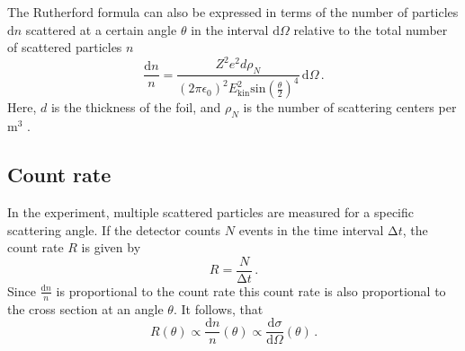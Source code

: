 The Rutherford formula can also be expressed in terms of the number of particles $\mathrm{d}n$ scattered at a certain angle $\theta$ in the interval $\mathrm{d} \Omega$ relative to the total number of scattered particles $n$
\begin{equation}
    \frac{\mathrm{d} n}{n} = \frac{Z^2 e^2 d \rho_{N}}{\left(2 \pi \epsilon_0\right)^2 E_{\mathrm{kin}}^2 \mathrm{sin}\left(\frac{\theta}{2}\right)^4} \, \mathrm{d} \Omega \, .
    \label{eqn:rutherfordn}
\end{equation}
Here, $d$ is the thickness of the foil, and $\rho_N$ is the number of scattering centers per $\unit{\meter\cubed}$ \cite[39-44]{haken_1984}.


\subsection{Count rate}
In the experiment, multiple scattered particles are measured for a specific scattering angle. 
If the detector counts $N$ events in the time interval $\mathrm{\Delta}t$, the count rate $R$ is given by
\begin{equation}
    R = \frac{N}{\mathrm{\Delta} t} \, . 
    \label{eqn:countrate}
\end{equation}
Since $\frac{\mathrm{d} n}{n}$ is proportional to the count rate \cite[42]{haken_1984}
this count rate is also proportional to the cross section at an angle $\theta$. %
It follows, that
\begin{equation} 
    R \left(\theta\right) \propto \frac{\mathrm{d} n}{n} \left(\theta\right) \propto \frac{\mathrm{d} \sigma}{\mathrm{d} \Omega} \left(\theta\right) \, .
    \label{eqn:RpropWQ}
\end{equation}




